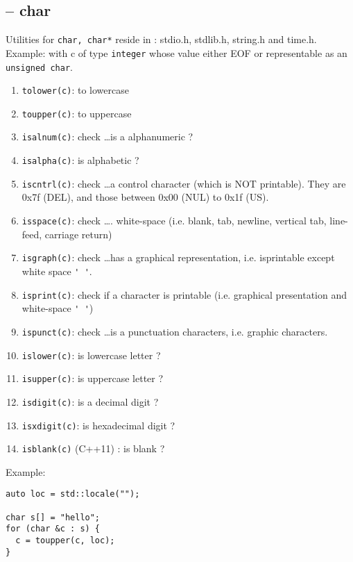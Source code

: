 \subsection{-- char}
Utilities for \verb!char, char*! reside in : stdio.h, stdlib.h, string.h and
time.h. Example: with c of type \verb!integer! whose value either EOF or
representable as an \verb!unsigned char!. 
\begin{enumerate}
  \item \verb!tolower(c)!: to lowercase
  \item \verb!toupper(c)!: to uppercase

  \item \verb!isalnum(c)!: check \ldots is a alphanumeric ?
  \item \verb!isalpha(c)!: is alphabetic ?
  
  \item \verb!iscntrl(c)!: check \ldots a control character (which is NOT
  printable). They are 0x7f (DEL), and those between 0x00 (NUL) to 0x1f (US).
  
  \item \verb!isspace(c)!: check \ldots. white-space (i.e. blank, tab, newline,
  vertical tab, line-feed, carriage return)
  
  \item \verb!isgraph(c)!: check \ldots has a graphical representation, i.e.
  isprintable except white space \verb!' '!.
  \item \verb!isprint(c)!: check if a character is printable (i.e. graphical
  presentation and white-space \verb!' '!)
  
  \item \verb!ispunct(c)!: check \ldots is a punctuation characters, i.e.
  graphic characters.
  \item \verb!islower(c)!: is lowercase letter ?
  \item \verb!isupper(c)!: is uppercase letter ?
  \item \verb!isdigit(c)!: is a decimal digit ?
  \item \verb!isxdigit(c)!: is  hexadecimal digit ?
  
  \item \verb!isblank(c)! (C++11) : is blank ?
\end{enumerate}

Example:
\begin{lstlisting}
auto loc = std::locale("");

char s[] = "hello";
for (char &c : s) {
  c = toupper(c, loc);
}
\end{lstlisting}


